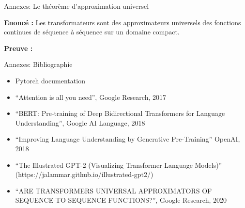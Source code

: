 \documentclass[12pt]{beamer}
\begin{document}

\begin{frame}{Annexes: Le théorème d'approximation universel}

\textbf{Enoncé :}
Les transformateurs sont des approximateurs universels des fonctions continues de séquence à séquence sur un domaine compact.

\textbf{Preuve :}



\end{frame}





\begin{frame}{Annexes: Bibliographie}
\footnotesize
\begin{itemize}
	\item Pytorch documentation
	\item ``Attention is all you need'', Google Research, 2017
	\item ``BERT: Pre-training of Deep Bidirectional Transformers for Language Understanding'', Google AI Language, 2018
	\item ``Improving Language Understanding by Generative Pre-Training'' OpenAI, 2018
	\item ``The Illustrated GPT-2 (Visualizing Transformer Language Models)'' (https://jalammar.github.io/illustrated-gpt2/)
	\item ``ARE TRANSFORMERS UNIVERSAL APPROXIMATORS OF SEQUENCE-TO-SEQUENCE FUNCTIONS?'', Google Research, 2020
\end{itemize}

\end{frame}
\end{document}
